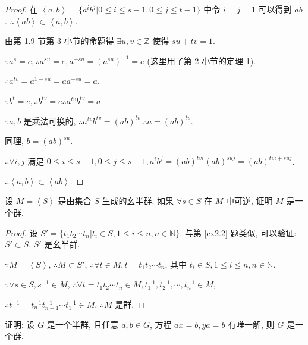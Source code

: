 \documentclass[color=black,device=normal,lang=cn,mode=geye]{elegantnote}
\begin{document}
\begin{proof}
    在 $\left<a,b\right>=\{a^ib^j|0\leq i\leq s-1,0\leq j\leq t-1\}$ 中令 $i=j=1$ 可以得到 $ab$. $\therefore\left<ab\right>\subset\left<a,b\right>$.

    由第 1.9 节第 3 小节的命题得 $\exists u,v\in\mathbb{Z}$ 使得 $su+tv=1$.

    $\because a^s=e,\therefore a^{su}=e,a^{-su}=(a^{su})^{-1}=e$ (这里用了第 2 小节的定理 1).

    $\therefore a^{tv}=a^{1-su}=aa^{-su}=a$.

    $\because b^t=e,\therefore b^{tv}=e\therefore a^{tv}b^{tv}=a$.

    $\because a,b$ 是乘法可换的, $\therefore a^{tv}b^{tv}=(ab)^{tv}.\therefore a=(ab)^{tv}$.

    同理, $b=(ab)^{su}$.

    $\therefore\forall i,j$ 满足 $0\leq i\leq s-1,0\leq j\leq s-1,a^ib^j=(ab)^{tvi}(ab)^{suj}=(ab)^{tvi+suj}$.

    $\therefore\left<a,b\right>\subset\left<ab\right>$.
\end{proof}
\begin{exercise}%
    设 $M=\left<S\right>$ 是由集合 $S$ 生成的幺半群. 如果 $\forall s\in S$ 在 $M$ 中可逆, 证明 $M$ 是一个群.
\end{exercise}
\begin{proof}
    设 $S'=\{t_1t_2\cdots t_n|t_i\in S,1\leq i\leq n,n\in\mathbb{N}\}$. 与第 \ref{ex2.2} 题类似, 可以验证: $S'\subset S$, $S'$ 是幺半群.

    $\because M=\left<S\right>$, $\therefore M\subset S'$, $\therefore\forall t\in M,t=t_1t_2\cdots t_n$, 其中 $t_i\in S,1\leq i\leq n,n\in\mathbb{N}$.

    $\because\forall s\in S,s^{-1}\in M$, $\therefore\forall t=t_1t_2\cdots t_n\in M,t_1^{-1},t_2^{-1},\cdots,t_n^{-1}\in M$,
    
    $\therefore t^{-1}=t_n^{-1}t_{n-1}^{-1}\cdots t_1^{-1}\in M$. $\therefore M$ 是群.
\end{proof}
\begin{exercise}%
    证明: 设 $G$ 是一个半群, 且任意 $a,b\in G$, 方程 $ax=b,ya=b$ 有唯一解, 则 $G$ 是一个群.
\end{exercise}
\end{document}
